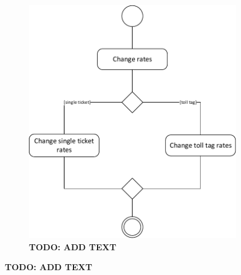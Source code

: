 \begin{figure}
\begin{subfigure}[b]{0.5\textwidth}
	\includegraphics[width=\textwidth]{img/activity_diagrams/Change_rates}
	\caption{\textbf{TODO: ADD TEXT}}
	\end{subfigure}
\end{figure}



